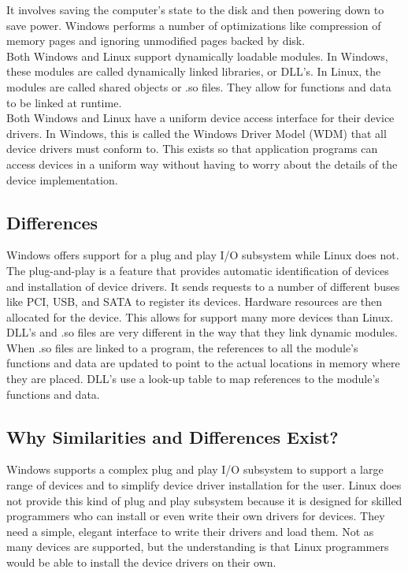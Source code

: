 \documentclass[letterpaper,10pt,titlepage]{article}
\begin{document}
It involves saving the computer's state to the disk and then powering down to
save power. Windows performs a number of optimizations like compression of 
memory pages and ignoring unmodified pages backed by disk.
\\
\linebreak
Both Windows and Linux support dynamically loadable modules. In Windows, these
modules are called dynamically linked libraries, or DLL's. In Linux, the 
modules are called shared objects or .so files. They allow for functions and 
data to be linked at runtime. 
\\
\linebreak
Both Windows and Linux have a uniform device access interface for their 
device drivers. In Windows, this is called the Windows Driver Model (WDM) 
that all device drivers must conform to. This exists so that application 
programs can access devices in a uniform way without having to worry about
the details of the device implementation. 
\subsection{Differences}
Windows offers support for a plug and play I/O subsystem while Linux does not.
The plug-and-play is a feature that provides automatic identification of 
devices and installation of device drivers. It sends requests to a number of
different buses like PCI, USB, and SATA to register its devices. Hardware 
resources are then allocated for the device. This allows for support many more
devices than Linux.
\\
\linebreak
DLL's and .so files are very different in the way that they link dynamic 
modules. When .so files are linked to a program, the references to all the 
module's functions and data are updated to point to the actual locations in 
memory where they are placed. DLL's use a look-up table to map references to 
the module's functions and data.
\subsection{Why Similarities and Differences Exist?}
Windows supports a complex plug and play I/O subsystem to support a large 
range of devices and to simplify device driver installation for the user. 
Linux does not provide this kind of plug and play subsystem because it is 
designed for skilled programmers who can install or even write their own 
drivers for devices. They need a simple, elegant interface to write their 
drivers and load them. Not as many devices are supported, but the understanding
is that Linux programmers would be able to install the device drivers on their
own.
%
\nocite{*}
\RaggedRight


\end{document}
